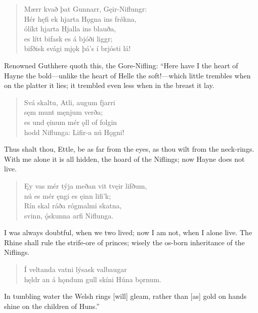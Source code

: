 \begin{verse}
\bva Mærr kvað þat Gunnarr, \hld Gęir-Niflungr: \\%
Hér hęfi ek hjarta \hld Hǫgna ins frǿkna, \\%
ólíkt hjarta \hld Hjalla ins blauða, \\%
es lítt bifask \hld es á bjóði liggr; \\%
bifðisk svági mjǫk \hld þá’s í brjósti lá!\\%
\end{verse}

\bvb Renowned Guthhere quoth this, the Gore-Nifling: “Here have I the heart of Hayne the bold—unlike the heart of Helle the soft!—which little trembles when on the platter it lies; it trembled even less when in the breast it lay.

\begin{verse}
\bva Svá skaltu, Atli, \hld augum fjarri \\%
sęm munt \hld męnjum verða; \\%
es und ęinum mér \hld ǫll of folgin \\%
hodd Niflunga: \hld Lifir-a nú Hǫgni!\\%
\end{verse}

\bvb Thus shalt thou, Ettle, be as far from the eyes, as thou wilt from the neck-rings. With me alone it is all hidden, the hoard of the Niflings; now Hayne does not live.

\begin{verse}
\bva Ęy vas mér týja \hld  meðan vit tvęir lifðum, \\%
nú es mér ęngi \hld es ęinn lifi’k; \\%
Rín skal ráða \hld rógmalmi skatna, \\%
svinn, ǫ́skunna \hld arfi Niflunga.\\%
\end{verse}

\bvb I was always doubtful, when we two lived; now I am not, when I alone live. The Rhine shall rule the strife-ore of princes; wisely the os-born inheritance of the Niflings.

\begin{verse}
\bva Í veltanda vatni \hld lýsask valbaugar \\%
hęldr an á hǫndum gull \hld skíni Húna bǫrnum.\\%
\end{verse}

\bvb In tumbling water the Welsh rings [will] gleam, rather than [as] gold on hands shine on the children of Huns.”
